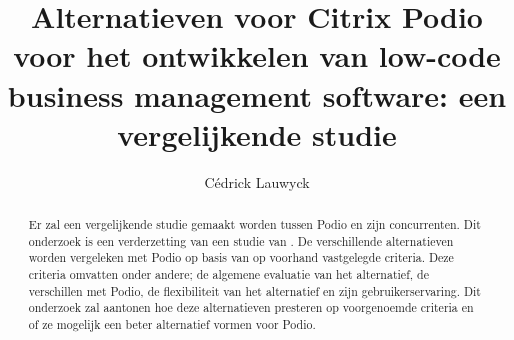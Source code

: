 \documentclass{hogent-article}
\title{Alternatieven voor Citrix Podio voor het ontwikkelen van low-code business management software: een vergelijkende studie}
\author{Cédrick Lauwyck}
\begin{document}
\begin{abstract}
Er zal een vergelijkende studie gemaakt worden tussen Podio en zijn concurrenten. Dit onderzoek is een verderzetting van een studie van \textcite{Spitaels2022}. De verschillende alternatieven worden vergeleken met Podio op basis van op voorhand vastgelegde criteria. Deze criteria omvatten onder andere; de algemene evaluatie van het alternatief, de verschillen met Podio, de flexibiliteit van het alternatief en zijn gebruikerservaring. Dit onderzoek zal aantonen hoe deze alternatieven presteren op voorgenoemde criteria en of ze mogelijk een beter alternatief vormen voor Podio.
\end{abstract}

\tableofcontents



\printbibliography[heading=bibintoc]
\end{document}
